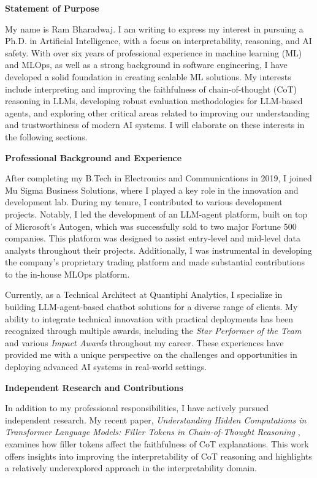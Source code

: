 \documentclass[12pt]{article}
\begin{document}
\textbf{Statement of Purpose}

My name is Ram Bharadwaj. I am writing to express my interest in pursuing a Ph.D. in Artificial Intelligence, with a focus on interpretability, reasoning, and AI safety. With over six years of professional experience in machine learning (ML) and MLOps, as well as a strong background in software engineering, I have developed a solid foundation in creating scalable ML solutions. My interests include interpreting and improving the faithfulness of chain-of-thought (CoT) reasoning in LLMs, developing robust evaluation methodologies for LLM-based agents, and exploring other critical areas related to improving our understanding and trustworthiness of modern AI systems. I will elaborate on these interests in the following sections.

\textbf{Professional Background and Experience}

After completing my B.Tech in Electronics and Communications in 2019, I joined Mu Sigma Business Solutions, where I played a key role in the innovation and development lab. During my tenure, I contributed to various development projects. Notably, I led the development of an LLM-agent platform, built on top of Microsoft’s Autogen, which was successfully sold to two major Fortune 500 companies. This platform was designed to assist entry-level and mid-level data analysts throughout their projects. Additionally, I was instrumental in developing the company's proprietary trading platform and made substantial contributions to the in-house MLOps platform.

Currently, as a Technical Architect at Quantiphi Analytics, I specialize in building LLM-agent-based chatbot solutions for a diverse range of clients. My ability to integrate technical innovation with practical deployments has been recognized through multiple awards, including the \emph{Star Performer of the Team} and various \emph{Impact Awards} throughout my career. These experiences have provided me with a unique perspective on the challenges and opportunities in deploying advanced AI systems in real-world settings.

\newpage
\textbf{Independent Research and Contributions}

In addition to my professional responsibilities, I have actively pursued independent research. My recent paper, \emph{Understanding Hidden Computations in Transformer Language Models: Filler Tokens in Chain-of-Thought Reasoning} \cite{bharadwaj2024understandinghiddencomputationschainofthought}, examines how filler tokens affect the faithfulness of CoT explanations. This work offers insights into improving the interpretability of CoT reasoning and highlights a relatively underexplored approach in the interpretability domain.
\end{document}
